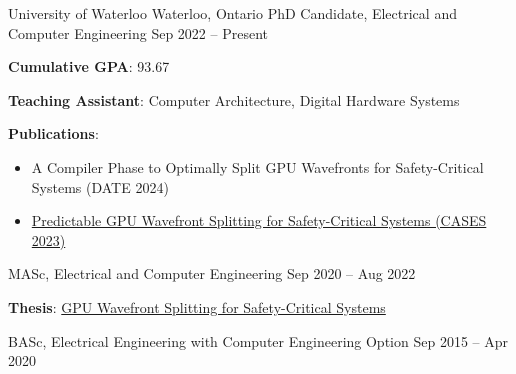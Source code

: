 

\begin{cventries}

\begin{cventrymulti}
{University of Waterloo}
{Waterloo, Ontario}
\cvposition
{PhD Candidate, Electrical and Computer Engineering}
{Sep 2022 -- Present}
{
  \begin{cvitems}
    \item \textbf{Cumulative GPA}: 93.67
    \item \textbf{Teaching Assistant}: Computer Architecture, Digital Hardware Systems
    \item \textbf{Publications}:
    \begin{itemize}
      \item A Compiler Phase to Optimally Split GPU Wavefronts for Safety-Critical Systems (DATE 2024)
      \item \href{https://dl.acm.org/doi/10.1145/3609102}{Predictable GPU Wavefront Splitting for Safety-Critical Systems (CASES 2023)}
    \end{itemize}
  \end{cvitems}
}
\cvposition
{MASc, Electrical and Computer Engineering}
{Sep 2020 -- Aug 2022}
{
  \begin{cvitems}
    \item \textbf{Thesis}: \href{https://uwspace.uwaterloo.ca/handle/10012/18872}{GPU Wavefront Splitting for Safety-Critical Systems}
  \end{cvitems}
}
\cvposition
{BASc, Electrical Engineering with Computer Engineering Option}
{Sep 2015 -- Apr 2020}
{
}
\end{cventrymulti}
\vspace{-1.5em}

\end{cventries}
